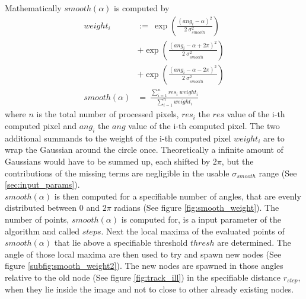 \documentclass[12pt,english,twocolumn]{revtex4}
\begin{document}
Mathematically $smooth(\alpha)$ is computed by
\begin{align*}
	weight_i &:= \ \exp{\left(\frac{(ang_i-\alpha)^2}{2 \ \sigma_{smooth}^2}\right)} \\
	& + \exp{\left(\frac{(ang_i-\alpha + 2 \pi)^2}{2 \ \sigma_{smooth}^2}\right)} \\
	& + \exp{\left(\frac{(ang_i-\alpha - 2 \pi)^2}{2 \ \sigma_{smooth}^2}\right)} \\
	smooth(\alpha) &= \ \frac{\sum_{i=1}^{n} res_i \ weight_i}{\sum_{i=1}^{n} weight_i}
\end{align*}
where $n$ is the total number of processed pixels, $res_i$ the $res$ value of the i-th computed pixel and $ang_i$ the $ang$ value of the i-th computed pixel. The two additional summands to the weight of the i-th computed pixel $weight_i$ are to wrap the Gaussian around the circle once. Theoretically a infinite amount of Gaussians would have to be summed up, each shifted by $2 \pi$, but the contributions of the missing terms are negligible in the usable $\sigma_{smooth}$ range (See \ref{sec:input_params}).\\
$smooth(\alpha)$ is then computed for a specifiable number of angles, that are evenly distributed between $0$ and $2 \pi$ radians (See figure \ref{fig:smooth_weight}). The number of points, $smooth(\alpha)$ is computed for, is a input parameter of the algorithm and called $steps$. Next the local maxima of the evaluated points of $smooth(\alpha)$ that lie above a specifiable threshold $thresh$ are determined. The angle of those local maxima are then used to try and spawn new nodes (See figure \ref{subfig:smooth_weight2}). The new nodes are spawned in those angles relative to the old node (See figure \ref{fig:track_ill}) in the specifiable distance $r_{step}$, when they lie inside the image and not to close to other already existing nodes.
\end{document}
